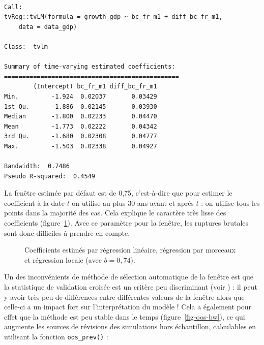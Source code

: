 \documentclass[
  a4paper,
  DIV=11,
  numbers=noendperiod,
  french]{scrartcl}
\newcommand\1{{\mathds 1}}
\theoremstyle{remark}
\begin{document}
\begin{verbatim}

Call: 
tvReg::tvLM(formula = growth_gdp ~ bc_fr_m1 + diff_bc_fr_m1, 
    data = data_gdp)

Class:  tvlm 

Summary of time-varying estimated coefficients: 
================================================ 
        (Intercept) bc_fr_m1 diff_bc_fr_m1
Min.         -1.924  0.02037       0.03429
1st Qu.      -1.886  0.02145       0.03930
Median       -1.800  0.02233       0.04470
Mean         -1.773  0.02222       0.04342
3rd Qu.      -1.680  0.02308       0.04777
Max.         -1.503  0.02338       0.04927

Bandwidth:  0.7486
Pseudo R-squared:  0.4549 
\end{verbatim}

La fenêtre estimée par défaut est de 0,75, c'est-à-dire que pour estimer
le coefficient à la date \(t\) on utilise au plus 30 ans avant et après
\(t\) : on utilise tous les points dans la majorité des cas. Cela
explique le caractère très lisse des coefficients
(figure~\ref{fig-coef-reg-mobile}). Avec ce paramètre pour la fenêtre,
les ruptures brutales sont donc difficiles à prendre en compte.

\begin{figure}

\caption{\label{fig-coef-reg-mobile}Coefficients estimés par régression
linéaire, régression par morceaux et régression locale (avec
\(b=0,74\)).}


\end{figure}%

Un des inconvénients de méthode de sélection automatique de la fenêtre
est que la statistique de validation croisée est un critère peu
discriminant (voir \textcite{Loader1999}) : il peut y avoir très peu de
différences entre différentes valeurs de la fenêtre alors que celle-ci a
un impact fort sur l'interprétation du modèle ! Cela a également pour
effet que la méthode est peu stable dans le temps
(figure~\ref{fig-oos-bw}), ce qui augmente les sources de révisions des
simulations hors échantillon, calculables en utilisant la fonction
\texttt{oos\_prev()} :
\end{document}
